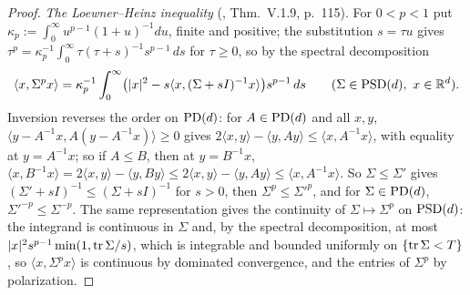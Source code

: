 \begin{proof}
\leanok
\emph{The Loewner--Heinz inequality} (, Thm.~V.1.9, p.~115). For $0 < p < 1$ put $\kappa_p := \int_0^\infty u^{p-1}(1+u)^{-1}du$,
finite and positive; the substitution $s = \tau u$ gives
$\tau^p = \kappa_p^{-1}\int_0^\infty\tau(\tau + s)^{-1}s^{p-1}\,ds$ for $\tau \ge 0$, so by the spectral
decomposition
\[
  \langle x,\Sigma^px\rangle = \kappa_p^{-1}\int_0^\infty\bigl(|x|^2 - s\langle x,(\Sigma + sI)^{-1}x\rangle\bigr)s^{p-1}\,ds
  \qquad (\Sigma \in \mathrm{PSD}(d),\ x \in \mathbb{R}^d).
\]
Inversion reverses the order on $\mathrm{PD}(d)$: for $A \in \mathrm{PD}(d)$ and all $x, y$,
$\langle y - A^{-1}x, A(y - A^{-1}x)\rangle \ge 0$ gives $2\langle x,y\rangle - \langle y,Ay\rangle \le \langle x,A^{-1}x\rangle$, with
equality at $y = A^{-1}x$; so if $A \le B$, then at $y = B^{-1}x$,
$\langle x,B^{-1}x\rangle = 2\langle x,y\rangle - \langle y,By\rangle \le 2\langle x,y\rangle - \langle y,Ay\rangle \le \langle x,A^{-1}x\rangle$. So
$\Sigma \le \Sigma'$ gives $(\Sigma' + sI)^{-1} \le (\Sigma + sI)^{-1}$ for $s > 0$, then $\Sigma^p \le \Sigma'^p$,
and for $\Sigma \in \mathrm{PD}(d)$, $\Sigma'^{-p} \le \Sigma^{-p}$. The same representation gives the continuity of
$\Sigma \mapsto \Sigma^p$ on $\mathrm{PSD}(d)$: the integrand is continuous in $\Sigma$ and, by the spectral decomposition,
at most $|x|^2s^{p-1}\min(1, \operatorname{tr}\Sigma/s)$, which is integrable and bounded uniformly on $\{\operatorname{tr}\Sigma < T\}$, so
$\langle x,\Sigma^px\rangle$ is continuous by dominated convergence, and the entries of $\Sigma^p$ by polarization.


\end{proof}
